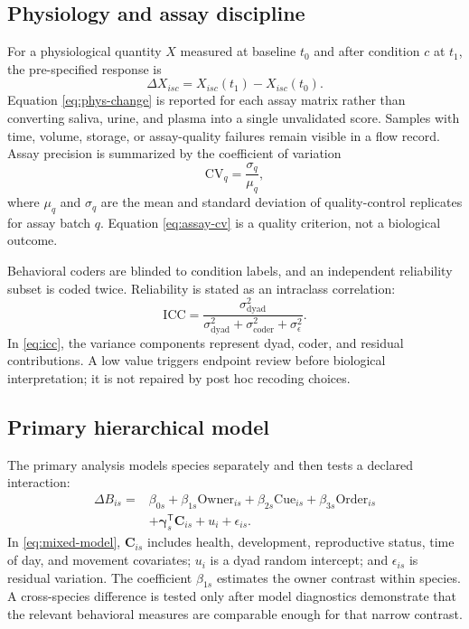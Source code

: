 \documentclass[conference]{IEEEtran}
\begin{document}
\subsection{Physiology and assay discipline}

For a physiological quantity $X$ measured at baseline $t_0$ and after condition $c$ at $t_1$, the pre-specified response is
\begin{equation}
\Delta X_{isc}=X_{isc}(t_1)-X_{isc}(t_0).
\label{eq:phys-change}
\end{equation}
Equation \eqref{eq:phys-change} is reported for each assay matrix rather than converting saliva, urine, and plasma into a single unvalidated score. Samples with time, volume, storage, or assay-quality failures remain visible in a flow record. Assay precision is summarized by the coefficient of variation
\begin{equation}
\mathrm{CV}_{q}=\frac{\sigma_q}{\mu_q},
\label{eq:assay-cv}
\end{equation}
where $\mu_q$ and $\sigma_q$ are the mean and standard deviation of quality-control replicates for assay batch $q$. Equation \eqref{eq:assay-cv} is a quality criterion, not a biological outcome.

Behavioral coders are blinded to condition labels, and an independent reliability subset is coded twice. Reliability is stated as an intraclass correlation:
\begin{equation}
\mathrm{ICC}=\frac{\sigma^2_{\mathrm{dyad}}}{\sigma^2_{\mathrm{dyad}}+\sigma^2_{\mathrm{coder}}+\sigma^2_{\epsilon}}.
\label{eq:icc}
\end{equation}
In \eqref{eq:icc}, the variance components represent dyad, coder, and residual contributions. A low value triggers endpoint review before biological interpretation; it is not repaired by post hoc recoding choices.

\subsection{Primary hierarchical model}

The primary analysis models species separately and then tests a declared interaction:
\begin{align}
\Delta B_{is}={}&\beta_{0s}+\beta_{1s}\mathrm{Owner}_{is}+\beta_{2s}\mathrm{Cue}_{is}
 +\beta_{3s}\mathrm{Order}_{is}\nonumber\\
&+\boldsymbol{\gamma}_{s}^{\mathsf{T}}\mathbf{C}_{is}+u_{i} +\epsilon_{is}.
\label{eq:mixed-model}
\end{align}
In \eqref{eq:mixed-model}, $\mathbf{C}_{is}$ includes health, development, reproductive status, time of day, and movement covariates; $u_i$ is a dyad random intercept; and $\epsilon_{is}$ is residual variation. The coefficient $\beta_{1s}$ estimates the owner contrast within species. A cross-species difference is tested only after model diagnostics demonstrate that the relevant behavioral measures are comparable enough for that narrow contrast.
\end{document}
